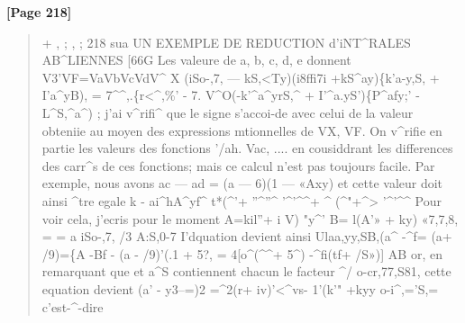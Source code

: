 \documentclass[11pt,a4paper]{book}
\begin{document}
\textbf{[Page 218]}\\[0.2cm]
\begin{quote}
+
, ; , ;
218 sua UN EXEMPLE DE REDUCTION d'iNT\textasciicircum{}RALES AB\textasciicircum{}LIENNES [66G
Les valeure de a, b, c, d, e donnent
V3'VF=VaVbVcVdV\textasciicircum{}
X (iSo-,7, --- kS,<Ty)(i8ffi7i +kS\textasciicircum{}ay)\{k'a-y,S, + I'a\textasciicircum{}yB),
= 7\textasciicircum{}\textasciicircum{},.\{r<\textasciicircum{},\%' - 7. V\textasciicircum{}O(-k'\textasciicircum{}a\textasciicircum{}yrS,\textasciicircum{} + I'\textasciicircum{}a.yS')\{P\textasciicircum{}afy;' - L\textasciicircum{}S,\textasciicircum{}a\textasciicircum{})
;
j'ai v\textasciicircum{}rifi\textasciicircum{} que le signe s'accoi-de avec celui de la valeur obteniie au moyen des
expressions mtionnelles de VX, VF.
On v\textasciicircum{}rifie en partie les valeurs des fonctions '/ah. Vac, .... en cousiddrant les
differences des carr\textasciicircum{}s de ces fonctions; mais ce calcul n'est pas toujours facile. Par
exemple, nous avons
ac --- ad = (a --- 6)(1 --- «Axy)
et cette valeur doit ainsi \textasciicircum{}tre egale k
- ai\textasciicircum{}hA\textasciicircum{}yf\textasciicircum{} t*(\textasciicircum{}'+ ''\textasciicircum{}''\textasciicircum{} '\textasciicircum{}'\textasciicircum{}\textasciicircum{}+ \textasciicircum{} (\textasciicircum{}"+\textasciicircum{}> '\textasciicircum{}'\textasciicircum{}\textasciicircum{}
Pour voir cela, j'ecris pour le moment
A=kil''+ i V) "y\textasciicircum{}' B= l(A'» + ky) «7,7,8,
= =
a iSo-,7, /3 A:S,0-7
I'dquation devient ainsi
Ulaa,yy,SB,(a\textasciicircum{} -\textasciicircum{}f= (a+ /9)=\{A -Bf - (a - /9)'(.1 + 5?,
= 4[o\textasciicircum{}(\textasciicircum{}\textasciicircum{}+ 5\textasciicircum{}) -\textasciicircum{}fi(tf+ /S»)]
AB
or, en remarquant que et a\textasciicircum{}S contiennent chacun le facteur \textasciicircum{}/ o-cr,77,S81, cette
equation devient
(a' - y3--=)2 =\textasciicircum{}2(r+ iv)'<\textasciicircum{}vs- 1'(k'" +kyy o-i\textasciicircum{},='S,=
c'est-\textasciicircum{}-dire
\end{quote}
\end{document}
